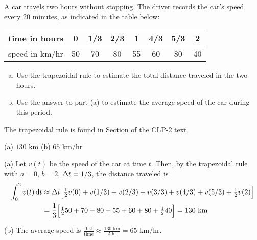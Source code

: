 \begin{Mquestion}[1997A]
A car travels two hours without stopping. The driver records
the car's speed every 20 minutes, as indicated in the table below:

\renewcommand{\arraystretch}{1.1}
\begin{center}
     \begin{tabular}{|l|c|c|c|c|c|c|c|}
          \hline
          time in hours&0&1/3&2/3&1&4/3&5/3&2  \\
          \hline
          speed in km/hr&50&70&80&55&60&80&40 \\
          \hline
     \end{tabular}
\end{center}
\renewcommand{\arraystretch}{1.0}

\begin{enumerate}[(a)]
\item
 Use the trapezoidal rule to estimate the total distance traveled in the two hours.
\item
 Use the answer to part (a)  to estimate the average speed of
the car during this period.
\end{enumerate}
\end{Mquestion}
\begin{hint}
The trapezoidal rule is found in  Section   of the
CLP-2 text.
\end{hint}

\begin{answer}
(a) $130\text{ km}$
\qquad (b)
$65\text{ km/hr}$

\end{answer}

\begin{solution} (a)
 Let $v(t)$ be the speed of the car at time $t$. Then,
by the trapezoidal rule with $a=0$, $b=2$, $\Delta t=1/3$, the distance traveled
is
\begin{align*}
\int_0^2 v(t)\,\mathrm{d}t
&\approx\Delta t\Big[\tfrac{1}{2} v(0)+v(1/3)+v(2/3)+v(3/3)
                      +v(4/3)+v(5/3)+\tfrac{1}{2} v(2)\Big]\\
&=\frac{1}{3}\Big[\tfrac{1}{2} 50+70+80+55+60+80+\tfrac{1}{2} 40\Big]
=130\text{ km}
\end{align*}

\noindent (b)
The average speed is $\frac{\text{dist}}{\text{time}} \approx \frac{130\text{ km}}{2\text{ hr}} =  65\text{ km/hr}$.
\end{solution}


